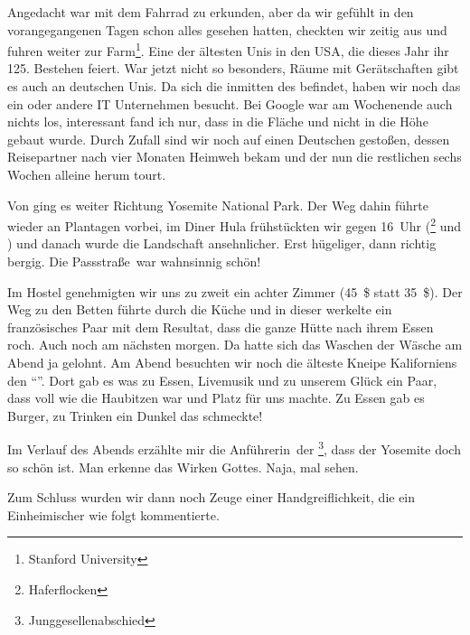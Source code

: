 Angedacht war  mit dem Fahrrad zu erkunden, aber da wir gefühlt in den vorangegangenen Tagen schon alles gesehen hatten, checkten wir zeitig aus und fuhren weiter zur \glqq Farm\grqq\footnote{Stanford University}.
Eine der ältesten Unis in den USA, die dieses Jahr ihr 125. Bestehen feiert.
War jetzt nicht so besonders, Räume mit Gerätschaften gibt es auch an deutschen Unis.
Da sich die  inmitten des  befindet, haben wir noch das ein oder andere IT Unternehmen besucht.
Bei Google war am Wochenende auch nichts los, interessant fand ich nur, dass in die Fläche und nicht in die Höhe gebaut wurde.
Durch Zufall sind wir noch auf einen Deutschen gestoßen, dessen Reisepartner nach vier Monaten Heimweh bekam und der nun die restlichen sechs Wochen alleine herum tourt.

Von  ging es weiter Richtung Yosemite National Park.
Der Weg dahin führte wieder an Plantagen vorbei, im Diner Hula frühstückten wir gegen 16~Uhr (\footnote{Haferflocken} und ) und danach wurde die Landschaft ansehnlicher.
Erst hügeliger, dann richtig bergig.
Die \glqq Passstraße\grqq \, war wahnsinnig schön!

Im Hostel  genehmigten wir uns zu zweit ein achter Zimmer (45~\$ statt 35~\$).
Der Weg zu den Betten führte durch die Küche und in dieser werkelte ein französisches Paar mit dem Resultat, dass die ganze Hütte nach ihrem Essen roch.
Auch noch am nächsten morgen.
Da hatte sich das Waschen der Wäsche am Abend ja gelohnt.
Am Abend besuchten wir noch die älteste Kneipe Kaliforniens den ``''.
Dort gab es was zu Essen, Livemusik und zu unserem Glück ein Paar, dass voll wie die Haubitzen war und Platz für uns machte.
Zu Essen gab es Burger, zu Trinken ein Dunkel das schmeckte!

Im Verlauf des Abends erzählte mir die \glqq Anführerin\grqq \, der \footnote{Junggesellenabschied}, dass der Yosemite doch so schön ist.
Man erkenne das Wirken Gottes.
Naja, mal sehen.

Zum Schluss wurden wir dann noch Zeuge einer Handgreiflichkeit, die ein Einheimischer wie folgt kommentierte.

\begin{quote}
\end{quote}
